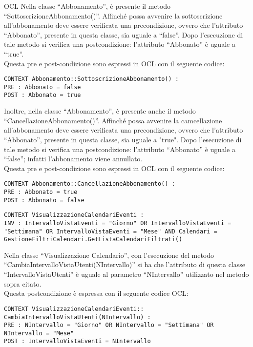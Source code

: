 \begin{listaPersonale}{OCL}
    Nella classe “Abbonamento”, è presente il metodo “SottoscrizioneAbbonamento()”. Affinché possa avvenire la sottoscrizione all'abbonamento deve essere verificata una precondizione, ovvero che l'attributo “Abbonato”, presente in questa classe, sia uguale a “false”. Dopo l'esecuzione di tale metodo si verifica una postcondizione: l'attributo “Abbonato” è uguale a “true”.\\
    Questa pre e post-condizione sono espressi in OCL con il seguente codice:
    \begin{lstlisting}
CONTEXT Abbonamento::SottoscrizioneAbbonamento() :
PRE : Abbonato = false
POST : Abbonato = true
    \end{lstlisting}
    Inoltre, nella classe “Abbonamento”, è presente anche il metodo “CancellazioneAbbonamento()”. Affinché possa avvenire la camcellazione all'abbonamento deve essere verificata una precondizione, ovvero che l'attributo “Abbonato”, presente in questa classe, sia uguale a "true". Dopo l'esecuzione di tale metodo si verifica una postcondizione: l'attributo “Abbonato” è uguale a “false”; infatti l'abbonamento viene annullato.\\
    Questa pre e post-condizione sono espressi in OCL con il seguente codice:
    \begin{lstlisting}
CONTEXT Abbonamento::CancellazioneAbbonamento() :
PRE : Abbonato = true
POST : Abbonato = false
    \end{lstlisting}




    \begin{lstlisting}
CONTEXT VisualizzazioneCalendariEventi :
INV : IntervalloVistaEventi = "Giorno" OR IntervalloVistaEventi = "Settimana" OR IntervalloVistaEventi = "Mese" AND Calendari = GestioneFiltriCalendari.GetListaCalendariFiltrati()
    \end{lstlisting}
    Nella classe “Visualizzazione Calendario”, con l'esecuzione del metodo “CambiaIntervalloVistaUtenti(NIntervallo)” si ha che l'attributo di questa classe “IntervalloVistaUtenti” è uguale al parametro “NIntervallo” utilizzato nel metodo sopra citato. \\
    Questa postcondizione è espressa con il seguente codice OCL:
    \begin{lstlisting}
CONTEXT VisualizzazioneCalendariEventi:: CambiaIntervalloVistaUtenti(NIntervallo) :
PRE : NIntervallo = "Giorno" OR NIntervallo = "Settimana" OR NIntervallo = "Mese"
POST : IntervalloVistaEventi = NIntervallo
    \end{lstlisting}





\end{listaPersonale}
